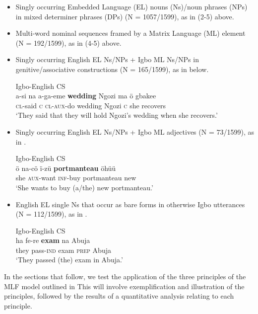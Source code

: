 \documentclass[output=paper]{langsci/langscibook}
\begin{document}
\begin{itemize}
 \item Singly occurring Embedded Language (EL) nouns (Ns)/noun phrases (NPs) in mixed determiner phrases (DPs) (N = 1057/1599), as in (2-5) above. 

 \item Multi-word nominal sequences framed by a Matrix Language (ML) element (N = 192/1599), as in (4-5) above.

 \item Singly occurring English EL Ns/NPs + Igbo ML Ns/NPs in genitive/associative constructions (N = 165/1599), as in  below.
 
\ea
{Igbo-English \textsc{CS}}\\
\gll a-si    na  a-ga-eme   \textbf{wedding  }Ngozi  ma   ö  gbakee\\
     \textsc{cl}{}-said  \textsc{c  cl-aux}{}-do  wedding  Ngozi  \textsc{c}\textsubscript{  }she  recovers\\
\glt ‘They said that they will hold Ngozi’s wedding when she recovers.’
\z

\item Singly occurring English EL Ns/NPs + Igbo ML adjectives (N = 73/1599), as in .
 

\ea
{Igbo-English \textsc{CS}}\\
\gll ö  na-cö    ï-zü    \textbf{portmanteau  }öhüü \\
     she  \textsc{aux}{}-want  \textsc{inf}{}-buy  portmanteau  new\\
\glt ‘She wants to buy (a/the) new portmanteau.’
\z
\item English EL single Ns that occur as bare forms in otherwise Igbo utterances (N = 112/1599), as in .


\ea
{Igbo-English \textsc{CS}}\\
\gll ha    fe-re    \textbf{exam}  na   Abuja\\
     they  pass-\textsc{ind}\textsubscript{  }exam  \textsc{prep}  Abuja \\
\glt ‘They passed (the) exam in Abuja.’
\z

\end{itemize}

In the sections that follow, we test the application of the three principles of the MLF model outlined in  This will involve exemplification and illustration of the principles, followed by the results of a quantitative analysis relating to each principle. 
\end{document}
